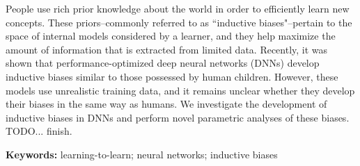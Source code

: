 People use rich prior knowledge about the world in order
to efficiently learn new concepts. These priors--commonly referred to as
``inductive biases"--pertain to the space of internal models considered by a
learner, and they help maximize the amount of information that is extracted
from limited data. Recently, it was shown that performance-optimized
deep neural networks (DNNs) develop inductive biases similar to those
possessed by human children. However, these models use unrealistic training
data, and it remains unclear whether they develop their biases in the same way
as humans. We investigate the development of inductive biases in DNNs and
perform novel parametric analyses of these biases. TODO... finish.

\textbf{Keywords:}
learning-to-learn; neural networks; inductive biases